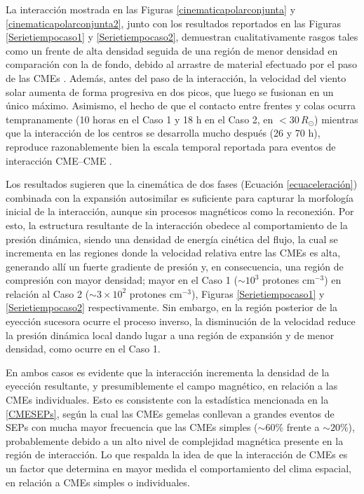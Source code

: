 La interacción mostrada en las Figuras \ref{cinematicapolarconjunta} y \ref{cinematicapolarconjunta2}, junto con los resultados reportados en las Figuras \ref{Serietiempocaso1} y \ref{Serietiempocaso2}, demuestran cualitativamente rasgos tales como un frente de alta densidad seguida de una región de menor densidad en comparación con la de fondo, debido al arrastre de material efectuado por el paso de las CMEs \parencite[e.g.,][]{niembro-2019, shiota-2016}. Además, antes del paso de la interacción, la velocidad del viento solar aumenta de forma progresiva en dos picos, que luego se fusionan en un único máximo. Asimismo, el hecho de que el contacto entre frentes y colas ocurra tempranamente (10 horas en el Caso 1 y 18 h en el Caso 2, en $<30\,R_\odot$) mientras que la interacción de los centros se desarrolla mucho después (26 y 70 h), reproduce razonablemente bien la escala temporal reportada para eventos de interacción CME--CME \parencite[e.g.,][]{mishra-2014}. 

Los resultados sugieren que la cinemática de dos fases (Ecuación \eqref{ecuaceleración}) combinada con la expansión autosimilar \parencite[e.g.,][]{savani-2011, riley-2004} es suficiente para capturar la morfología inicial de la interacción, aunque sin procesos magnéticos como la reconexión. Por esto, la estructura resultante de la interacción obedece al comportamiento de la presión dinámica, siendo una densidad de energía cinética del flujo, la cual se incrementa en las regiones donde la velocidad relativa entre las CMEs es alta, generando allí un fuerte gradiente de presión y, en consecuencia, una región de compresión con mayor densidad; mayor en el Caso 1 ($\sim 10^3$ protones cm$^{-3}$) en relación al Caso 2 ($\sim 3\times 10^2$ protones cm$^{-3}$), Figuras \ref{Serietiempocaso1} y \ref{Serietiempocaso2} respectivamente. Sin embargo, en la región posterior de la eyección sucesora ocurre el proceso inverso, la disminución de la velocidad reduce la presión dinámica local dando lugar a una región de expansión y de menor densidad, como ocurre en el Caso 1.

En ambos casos es evidente que la interacción incrementa la densidad de la eyección resultante, y presumiblemente el campo magnético, en relación a las CMEs individuales. Esto es consistente con la estadística mencionada en la \autoref{CMESEPs}, según la cual las CMEs gemelas conllevan a grandes eventos de \acp{SEP} con mucha mayor frecuencia que las CMEs simples ($\sim 60\%$ frente a $\sim 20\%$), probablemente debido a un alto nivel de complejidad magnética presente en la región de interacción. Lo que respalda la idea de que la interacción de CMEs es un factor que determina en mayor medida el comportamiento del clima espacial, en relación a CMEs simples o individuales.

